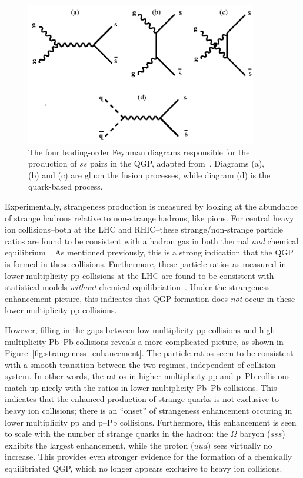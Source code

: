 \begin{figure}[ht]
    \centering
    \includegraphics[width=0.9\textwidth]{figures/introduction/ssbar_production.png}
    \caption{The four leading-order Feynman diagrams responsible for the production of $s\bar{s}$ pairs in the QGP, adapted from~\cite{Strangeness}. Diagrams (a), (b) and (c) are gluon the fusion processes, while diagram (d) is the quark-based process.}
    \label{fig:ssbar_production}
\end{figure}

Experimentally, strangeness production is measured by looking at the abundance of strange hadrons relative to non-strange hadrons, like pions. For central heavy ion collisions--both at the LHC and RHIC--these strange/non-strange particle ratios are found to be consistent with a hadron gas in both thermal \textit{and} chemical equilibrium~\cite{NATURE12, NATURE13}. As mentioned previously, this is a strong indication that the QGP is formed in these collisions. Furthermore, these particle ratios as measured in lower multiplicity pp collisions at the LHC are found to be consistent with statistical models \textit{without} chemical equilibriation~\cite{NATURE14, NATURE15}. Under the strangeness enhancement picture, this indicates that QGP formation does \textit{not} occur in these lower multiplicity pp collisions. 

 However, filling in the gaps between low multiplicity pp collisions and high multiplicity Pb--Pb collisions reveals a more complicated picture, as shown in Figure~\ref{fig:strangeness_enhancement}. The particle ratios seem to be consistent with a smooth transition between the two regimes, independent of collision system. In other words, the ratios in higher multiplicity pp and p--Pb collisions match up nicely with the ratios in lower multiplicity Pb--Pb collisions. This indicates that the enhanced production of strange quarks is not exclusive to heavy ion collisions; there is an ``onset'' of strangeness enhancement occuring in lower multiplicity pp and p--Pb collisions. Furthermore, this enhancement is seen to scale with the number of strange quarks in the hadron: the $\Omega$ baryon ($sss$) exhibits the largest enhancement, while the proton ($uud$) sees virtually no increase. This provides even stronger evidence for the formation of a chemically equilibriated QGP, which no longer appears exclusive to heavy ion collisions.

